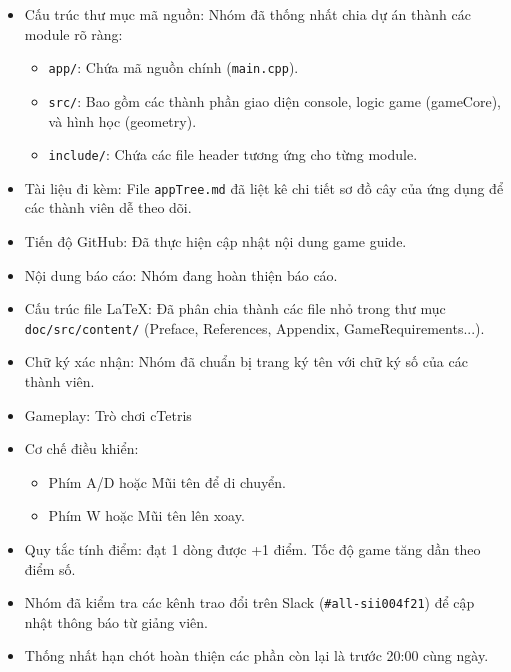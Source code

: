 \documentclass[12pt,a4paper]{article}
\begin{document}
\begin{itemize}
    \item Cấu trúc thư mục mã nguồn: Nhóm đã thống nhất chia dự án thành các module rõ ràng:
    \begin{itemize}
        \item \texttt{app/}: Chứa mã nguồn chính (\texttt{main.cpp}).
        \item \texttt{src/}: Bao gồm các thành phần giao diện console, logic game (gameCore), và hình học (geometry).
        \item \texttt{include/}: Chứa các file header tương ứng cho từng module.
    \end{itemize}
    \item Tài liệu đi kèm: File \texttt{appTree.md} đã liệt kê chi tiết sơ đồ cây của ứng dụng để các thành viên dễ theo dõi.
    \item Tiến độ GitHub: Đã thực hiện cập nhật nội dung game guide.
\end{itemize}

\begin{itemize}
    \item Nội dung báo cáo: Nhóm đang hoàn thiện báo cáo.
    \item Cấu trúc file LaTeX: Đã phân chia thành các file nhỏ trong thư mục \texttt{doc/src/content/} (Preface, References, Appendix, GameRequirements...).
    \item Chữ ký xác nhận: Nhóm đã chuẩn bị trang ký tên với chữ ký số của các thành viên.
\end{itemize}

\begin{itemize}
    \item Gameplay: Trò chơi cTetris
    \item Cơ chế điều khiển:
    \begin{itemize}
        \item Phím A/D hoặc Mũi tên để di chuyển.
        \item Phím W hoặc Mũi tên lên xoay.
    \end{itemize}
    \item Quy tắc tính điểm: đạt 1 dòng được +1 điểm. Tốc độ game tăng dần theo điểm số.
\end{itemize}

\begin{itemize}
    \item Nhóm đã kiểm tra các kênh trao đổi trên Slack (\texttt{\#all-sii004f21}) để cập nhật thông báo từ giảng viên.
    \item Thống nhất hạn chót hoàn thiện các phần còn lại là trước 20:00 cùng ngày.
\end{itemize}
\end{document}
